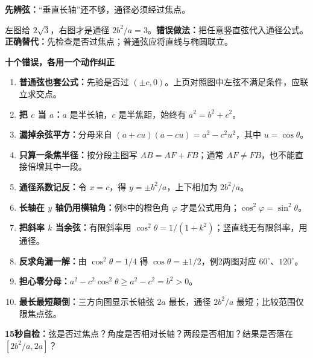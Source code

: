 \clearpage
\begin{trapbox}
\textbf{先辨弦：}“垂直长轴”还不够，通径必须经过焦点。
\begin{center}\end{center}
左图给 $2\sqrt3$，右图才是通径 $2b^2/a=3$。\textbf{错误做法：}把任意竖直弦代入通径公式。
\textbf{正确替代：}先检查是否过焦点；普通弦应将直线与椭圆联立。
\end{trapbox}
\clearpage

\begin{trapbox}
\textbf{\textcolor{CTrap}{十个错误，各用一个动作纠正}}
\begin{enumerate}[leftmargin=*,itemsep=.65em,topsep=.5em]
\item \textbf{普通弦也套公式：}先验是否过 $(\pm c,0)$。上页对照图中左弦不满足条件，应联立求交点。
\item \textbf{把 $c$ 当 $a$：}$a$ 是半长轴，$c$ 是半焦距，始终有 $a^2=b^2+c^2$。
\item \textbf{漏掉余弦平方：}分母来自 $(a+cu)(a-cu)=a^2-c^2u^2$，其中 $u=\cos\theta$。
\item \textbf{只算一条焦半径：}按分段主图写 $AB=AF+FB$；通常 $AF\ne FB$，也不能直接倍增其中一段。
\item \textbf{通径系数记反：}令 $x=c$，得 $y=\pm b^2/a$，上下相加为 $2b^2/a$。
\item \textbf{长轴在 $y$ 轴仍用横轴角：}例8中的橙色角 $\varphi$ 才是公式用角；$\cos^2\varphi=\sin^2\theta$。
\item \textbf{把斜率 $k$ 当余弦：}有限斜率用 $\cos^2\theta=1/(1+k^2)$；竖直线无有限斜率，用通径。
\item \textbf{反求角漏一解：}由 $\cos^2\theta=1/4$ 得 $\cos\theta=\pm1/2$，例2两图对应 $60^\circ$、$120^\circ$。
\item \textbf{担心零分母：}$a^2-c^2\cos^2\theta\ge a^2-c^2=b^2>0$。
\item \textbf{最长最短颠倒：}三方向图显示长轴弦 $2a$ 最长，通径 $2b^2/a$ 最短；比较范围仅限焦点弦。
\end{enumerate}
\medskip
\textbf{15秒自检：}弦是否过焦点？角度是否相对长轴？两段是否相加？结果是否落在 $[2b^2/a,2a]$？
\end{trapbox}
